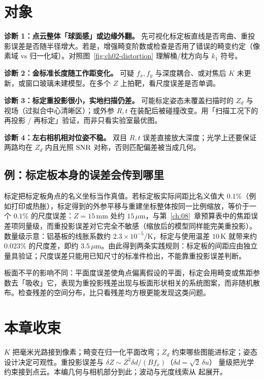 \section{对象}
\label{sec:ch02-object}

\textbf{诊断 1：点云整体「球面感」或边缘外翻。} 先可视化标定板直线是否弯曲、重投影误差是否随半径增大。若是，增强畸变阶数或检查是否用了错误的畸变约定（像素域 vs 归一化域）。对照图~\ref{fig:ch02-distortion} 理解桶/枕方向与 $k_1$ 符号。

\textbf{诊断 2：金标准长度随工作距变化。} 可疑 $f_x,f_y$ 与深度耦合、或对焦后 $K$ 未更新，或窗口玻璃未建模型。在多个 $Z$ 上拍靶，看尺度误差是否单调。

\textbf{诊断 3：标定重投影很小，实地扫描仍差。} 可能标定姿态未覆盖扫描时的 $Z_d$ 与视场（过拟合中心清晰区）；或外参 $R,t$ 在装配后被碰撞改变。用「扫描工况下的再投影 / 再标定」验证，而非只看实验室最优图。

\textbf{诊断 4：左右相机相对位姿不稳。} 双目 $R,t$ 误差直接放大深度；光学上还要保证两路均在 $Z_d$ 内且光照 $\mathrm{SNR}$ 对称，否则匹配偏差被当成几何。


\subsection{例：标定板本身的误差会传到哪里}

标定把标定板角点的名义坐标当作真值。若标定板实际间距比名义值大 $0.1\%$（例如打印或热胀），标定得到的外参平移与重建坐标整体按同一比例缩放，等价于一个 $0.1\%$ 的尺度误差：$Z=15\,\mathrm{mm}$ 处约 $15\,\mu\mathrm{m}$，与第~\ref{ch:08}~章预算表中的焦距误差项同量级，而重投影误差对它完全不敏感（缩放后的模型同样能完美重投影）。数量级示意：铝基板的线胀系数约 $2.3\times10^{-5}/\mathrm{K}$，标定与使用温差 $10\,\mathrm{K}$ 就带来约 $0.023\%$ 的尺度差，即约 $3.5\,\mu\mathrm{m}$。由此得到两条实践规则：标定板的间距应由独立量具验证；尺度误差只能用已知尺寸的标准件检出，不能靠重投影误差判断。

板面不平的影响不同：平面度误差使角点偏离假设的平面，标定会用畸变或焦距参数去「吸收」它，表现为重投影残差出现与板面形状相关的系统图案，而非随机散布。检查残差的空间分布，比只看残差均方根更能发现这类问题。

\section*{本章收束}
$K$ 把毫米光路接到像素；畸变在归一化平面改弯；$Z_d$ 约束哪些图能进标定；姿态设计决定可观性。重投影误差与 $\delta Z\sim Z^2\delta d/(B f_x)$（$\delta d=\sqrt2\,\delta u$） 量级把光学约束接到点云。本编几何与相机部分到此；波动与光度线索从  起展开。

